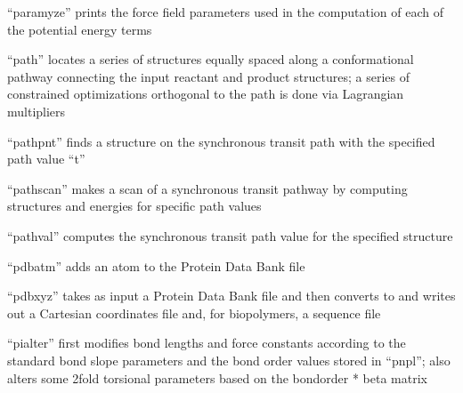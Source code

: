 \documentclass[letterpaper,11pt,english]{sphinxmanual}
\begin{document}
“paramyze” prints the force field parameters used in the computation of each of the potential energy terms












“path” locates a series of structures equally spaced along a conformational pathway connecting the input reactant and product structures; a series of constrained optimizations orthogonal to the path is done via Lagrangian multipliers



“pathpnt” finds a structure on the synchronous transit path with the specified path value “t”


“pathscan” makes a scan of a synchronous transit pathway by computing structures and energies for specific path values


“pathval” computes the synchronous transit path value for the specified structure


“pdbatm” adds an atom to the Protein Data Bank file


“pdbxyz” takes as input a Protein Data Bank file and then converts to and writes out a Cartesian coordinates file and, for biopolymers, a sequence file


“pialter” first modifies bond lengths and force constants according to the standard bond slope parameters and the bond order values stored in “pnpl”; also alters some 2\sphinxhyphen{}fold torsional parameters based on the bond\sphinxhyphen{}order * beta matrix
\end{document}
